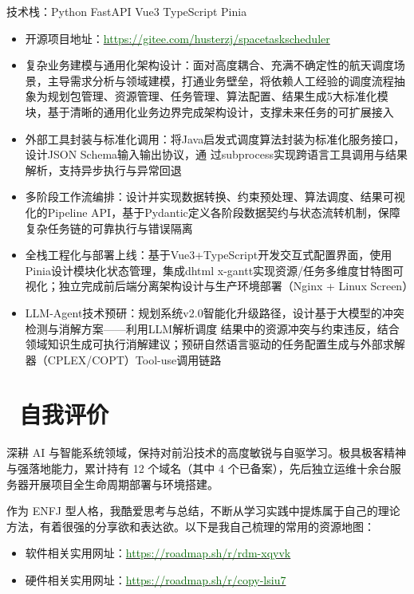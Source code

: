 \documentclass{resume} %
\begin{document}
	\large {技术栈：Python \textbullet{} FastAPI \textbullet{} Vue3 \textbullet{} TypeScript \textbullet{} Pinia}
	\begin{itemize}
		\item 开源项目地址：\href{https://gitee.com/husterzj/spacetaskscheduler}{\textcolor{darkgreen}{https://gitee.com/husterzj/spacetaskscheduler}}
		\item 复杂业务建模与通用化架构设计：面对高度耦合、充满不确定性的航天调度场景，主导需求分析与领域建模，打通业务壁垒，将依赖人工经验的调度流程抽象为规划包管理、资源管理、任务管理、算法配置、结果生成5大标准化模块，基于清晰的通用化业务边界完成架构设计，支撑未来任务的可扩展接入
		\item 外部工具封装与标准化调用：将Java启发式调度算法封装为标准化服务接口，设计JSON Schema输入输出协议，通
		过subprocess实现跨语言工具调用与结果解析，支持异步执行与异常回退
		\item 多阶段工作流编排：设计并实现数据转换、约束预处理、算法调度、结果可视化的Pipeline API，基于Pydantic定义各阶段数据契约与状态流转机制，保障复杂任务链的可靠执行与错误隔离
		\item 全栈工程化与部署上线：基于Vue3+TypeScript开发交互式配置界面，使用Pinia设计模块化状态管理，集成dhtml
		x-gantt实现资源/任务多维度甘特图可视化；独立完成前后端分离架构设计与生产环境部署（Nginx + Linux Screen）
		\item LLM-Agent技术预研：规划系统v2.0智能化升级路径，设计基于大模型的冲突检测与消解方案——利用LLM解析调度
		结果中的资源冲突与约束违反，结合领域知识生成可执行消解建议；预研自然语言驱动的任务配置生成与外部求解器（CPLEX/COPT）Tool-use调用链路
	\end{itemize}
	
	
	\section{\faUser\ 自我评价}
	\hspace{2em}深耕 AI 与智能系统领域，保持对前沿技术的高度敏锐与自驱学习。极具极客精神与强落地能力，累计持有 12 个域名（其中 4 个已备案），先后独立运维十余台服务器开展项目全生命周期部署与环境搭建。
	
	\hspace{2em}作为 ENFJ 型人格，我酷爱思考与总结，不断从学习实践中提炼属于自己的理论方法，有着很强的分享欲和表达欲。以下是我自己梳理的常用的资源地图：
	\begin{itemize}[parsep=0.5ex, leftmargin=1.5em]
	    \item 软件相关实用网址：\href{https://roadmap.sh/r/rdm-xqyvk}{\textcolor{darkgreen}{https://roadmap.sh/r/rdm-xqyvk}}
	    \item 硬件相关实用网址：\href{https://roadmap.sh/r/copy-lsiu7}{\textcolor{darkgreen}{https://roadmap.sh/r/copy-lsiu7}}
	\end{itemize}
\end{document}
